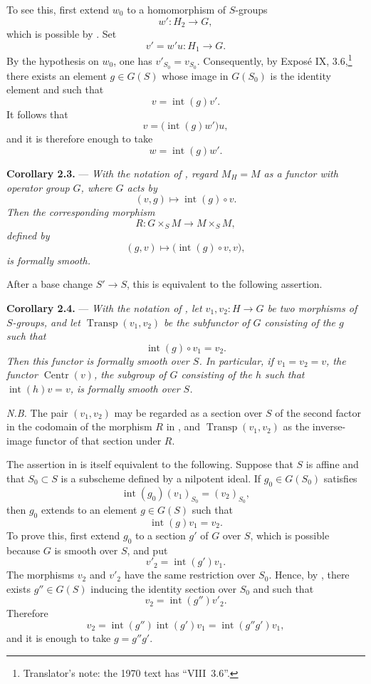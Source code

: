 To see this, first extend \(w_0\) to a homomorphism of \(S\)-groups
\[
  w':H_2\longrightarrow G,
\]
which is possible by
.  Set
\[
  v'=w'u:H_1\longrightarrow G.
\]
By the hypothesis on \(w_0\), one has \(v'_{S_0}=v_{S_0}\).
Consequently, by Exposé IX, 3.6,\footnote{Translator's note: the 1970 text has ``VIII~3.6''.}
there exists an element
\(g\in G(S)\) whose image in \(G(S_0)\) is the identity element and
such that
\[
  v=\operatorname{int}(g)v'.
\]
It follows that
\[
  v=\bigl(\operatorname{int}(g)w'\bigr)u,
\]
and it is therefore enough to take
\[
  w=\operatorname{int}(g)w'.
\]

\medskip
\noindent{}\textbf{Corollary 2.3.} ---
\textit{With the notation of
, regard \(M_H=M\) as a
functor with operator group \(G\), where \(G\) acts by
\[
  (v,g)\longmapsto\operatorname{int}(g)\circ v.
\]
Then the corresponding morphism}
\[
  R:G\times_S M\longrightarrow M\times_S M,
\]
\textit{defined by
\[
  (g,v)\longmapsto\bigl(\operatorname{int}(g)\circ v,v\bigr),
\]
is formally smooth.}

After a base change \(S'\to S\), this is equivalent to the following
assertion.

\medskip
\noindent{}\textbf{Corollary 2.4.} ---
\textit{With the notation of
, let
\(v_1,v_2:H\to G\) be two morphisms of \(S\)-groups, and let
\(\operatorname{Transp}(v_1,v_2)\) be the subfunctor of \(G\)
consisting of the \(g\) such that
\[
  \operatorname{int}(g)\circ v_1=v_2.
\]
Then this functor is formally smooth over \(S\).  In particular, if
\(v_1=v_2=v\), the functor \(\operatorname{Centr}(v)\), the subgroup
of \(G\) consisting of the \(h\) such that
\(\operatorname{int}(h)v=v\), is formally smooth over \(S\).}

\emph{N.B.} The pair \((v_1,v_2)\) may be regarded as a section over
\(S\) of the second factor in the codomain of the morphism \(R\) in
, and
\(\operatorname{Transp}(v_1,v_2)\) as the inverse-image functor of
that section under \(R\).

The assertion in
 is itself equivalent to the
following.  Suppose that \(S\) is affine and that \(S_0\subset S\) is
a subscheme defined by a nilpotent ideal.  If
\(g_0\in G(S_0)\) satisfies
\[
  \operatorname{int}(g_0)(v_1)_{S_0}=(v_2)_{S_0},
\]
then \(g_0\) extends to an element \(g\in G(S)\) such that
\[
  \operatorname{int}(g)v_1=v_2.
\]
To prove this, first extend \(g_0\) to a section \(g'\) of \(G\) over
\(S\), which is possible because \(G\) is smooth over \(S\), and put
\[
  v'_2=\operatorname{int}(g')v_1.
\]
The morphisms \(v_2\) and \(v'_2\) have the same restriction over
\(S_0\).  Hence, by , there exists
\(g''\in G(S)\) inducing the identity section over \(S_0\) and such
that
\[
  v_2=\operatorname{int}(g'')v'_2.
\]
Therefore
\[
  v_2
  =\operatorname{int}(g'')\operatorname{int}(g')v_1
  =\operatorname{int}(g''g')v_1,
\]
and it is enough to take \(g=g''g'\).

